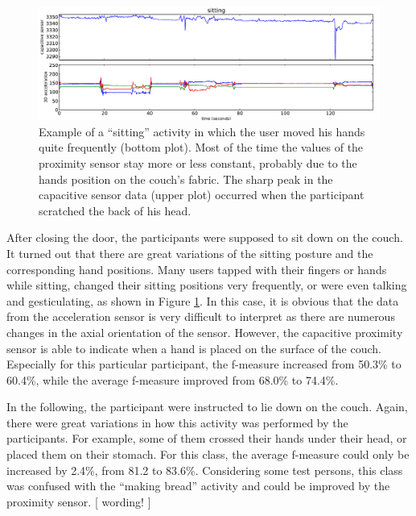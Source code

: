 \documentclass[runningheads,a4paper]{llncs}
\begin{document}
\begin{figure}
	\centering
		\includegraphics[width=1.00\textwidth]{../Auswertung/images/eugen_2.pdf}
	\caption{Example of a ``sitting'' activity in which the user moved his hands quite frequently (bottom plot). Most of the time the values of the proximity sensor stay more or less constant, probably due to the hands position on the couch's fabric. The sharp peak in the capacitive sensor data (upper plot) occurred when the participant scratched the back of his head. }
	\label{fig:sitting}
\end{figure}

After closing the door, the participants were supposed to sit down on the couch. It turned out that there are great variations of the sitting posture and the corresponding hand positions. Many users tapped with their fingers or hands while sitting, changed their sitting positions very frequently, or were even talking and gesticulating, as shown in Figure \ref{fig:sitting}. In this case, it is obvious that the data from the acceleration sensor is very difficult to interpret as there are numerous changes in the axial orientation of the sensor. However, the capacitive proximity sensor is able to indicate when a hand is placed on the surface of the couch. Especially for this particular participant, the f-measure increased from 50.3\% to 60.4\%, while the average f-measure improved from 68.0\% to 74.4\%. 

In the following, the participant were instructed to lie  down on the couch. Again, there were great variations in how this activity was performed by the participants. For example, some of them crossed their hands under their head, or placed them on their stomach. For this class, the average f-measure could only be increased by 2.4\%, from 81.2 to 83.6\%. Considering some test persons, this class was confused with the ``making bread'' activity and could be improved by the proximity sensor. [ wording! ] 
\end{document}

